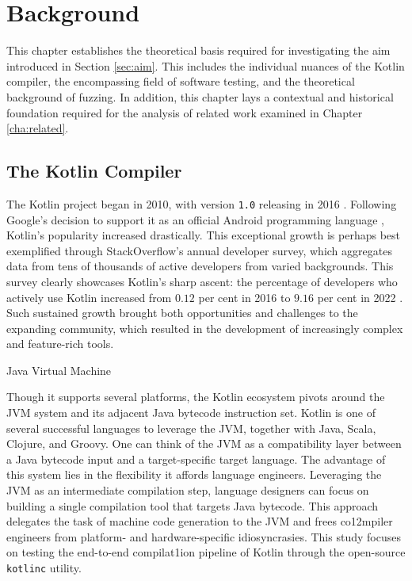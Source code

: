 \chapter{\label{cha:background}Background} 

This chapter establishes the theoretical basis
required for investigating the aim introduced in
Section \ref{sec:aim}.
This includes the individual nuances of the Kotlin compiler,
the encompassing field of software testing, and the theoretical
background of fuzzing.
In addition, this chapter lays a contextual and historical foundation
required for the analysis of related work examined in Chapter \ref{cha:related}.

\section{The Kotlin Compiler}

The Kotlin project began in 2010, with version \texttt{1.0} releasing
in 2016 \citep{stepanov2021type}.
Following Google's decision to support it as an official Android
programming language \cite{kotlin5years}, Kotlin's popularity increased drastically.
This exceptional growth is perhaps best exemplified through
StackOverflow's annual developer survey, which aggregates data from
tens of thousands of active developers from varied backgrounds.
This survey clearly showcases Kotlin's sharp ascent: the percentage of
developers who actively use Kotlin increased from $0.12$ per cent in 2016
to $9.16$ per cent in 2022 \citep{sosurvey2016, sosurvey2022}. 
Such sustained growth brought both opportunities and challenges to the
expanding community, which resulted in the development of increasingly
complex and feature-rich tools.

 {Java Virtual Machine}

Though it supports several platforms, the Kotlin ecosystem pivots around
the \Gls{JVM} system and its adjacent Java bytecode instruction set.
Kotlin is one of several successful languages to leverage the \gls{JVM},
together with Java, Scala, Clojure, and Groovy. 
One can think of the \gls{JVM} as a compatibility layer
between a Java bytecode input and a target-specific target language.
The advantage of this system lies in the flexibility it affords
language engineers.
Leveraging the \gls{JVM} as an intermediate compilation step,
language designers can focus on building a single compilation tool
that targets Java bytecode.
This approach delegates the task of machine code
generation to the \gls{JVM} and frees co12mpiler engineers from
platform- and hardware-specific idiosyncrasies.
This study focuses on testing the end-to-end compilat1ion pipeline
of Kotlin through the open-source \texttt{kotlinc} utility.

